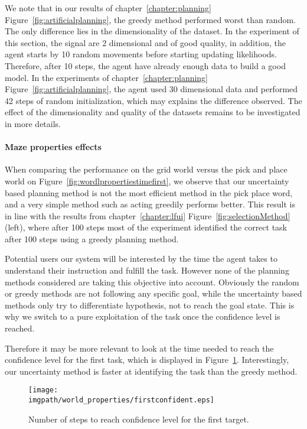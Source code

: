 We note that in our results of chapter~\ref{chapter:planning} Figure~\ref{fig:artificialplanning}, the greedy method performed worst than random. The only difference lies in the dimensionality of the dataset. In the experiment of this section, the signal are 2 dimensional and of good quality, in addition, the agent starts by 10 random movements before starting updating likelihoods. Therefore, after 10 steps, the agent have already enough data to build a good model. In the experiments of chapter~\ref{chapter:planning} Figure~\ref{fig:artificialplanning}, the agent used 30 dimensional data and performed 42 steps of random initialization, which may explains the difference observed. The effect of the dimensionality and quality of the datasets remains to be investigated in more details.

\paragraph{Maze properties effects}

When comparing the performance on the grid world versus the pick and place world on Figure~\ref{fig:wordlpropertiestimefirst}, we observe that our uncertainty based planning method is not the most efficient method in the pick place word, and a very simple method such as acting greedily performs better. This result is in line with the results from chapter~\ref{chapter:lfui} Figure~\ref{fig:selectionMethod} (left), where after 100 steps most of the experiment identified the correct task after 100 steps using a greedy planning method.

Potential users our system will be interested by the time the agent takes to understand their instruction and fulfill the task. However none of the planning methods considered are taking this objective into account. Obviously the random or greedy methods are not following any specific goal, while the uncertainty based methods only try to differentiate hypothesis, not to reach the goal state. This is why we switch to a pure exploitation of the task once the confidence level is reached.

Therefore it may be more relevant to look at the time needed to reach the confidence level for the first task, which is displayed in Figure~\ref{fig:wordlpropertiesconfidencefirst}. Interestingly, our uncertainty method is faster at identifying the task than the greedy method.

\begin{figure}[!htbp]
\centering
\texttt{[image: \\imgpath/world\_properties/firstconfident.eps]}
\caption{Number of steps to reach confidence level for the first target.}
\label{fig:wordlpropertiesconfidencefirst}
\end{figure} 

